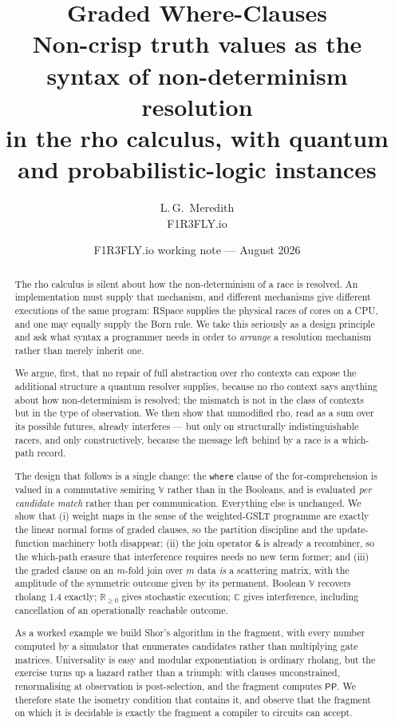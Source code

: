 \documentclass[11pt,a4paper]{article}
\title{\bfseries Graded Where-Clauses\\[4pt]
\large Non-crisp truth values as the syntax of non-determinism resolution\\
in the rho calculus, with quantum and probabilistic-logic instances}
\author{L.\,G.\ Meredith\\ \small F1R3FLY.io}
\date{F1R3FLY.io working note --- August 2026}
\theoremstyle{plain}
\theoremstyle{definition}
\theoremstyle{remark}
\newcommand{\V}{\mathbb{V}}
\newcommand{\Rnn}{\mathbb{R}_{\geq 0}}
\newcommand{\Cx}{\mathbb{C}}
\begin{document}
\maketitle

\begin{abstract}
The rho calculus is silent about how the non-determinism of a race is resolved.
An implementation must supply that mechanism, and different mechanisms give
different executions of the same program: RSpace supplies the physical races of
cores on a CPU, and one may equally supply the Born rule. We take this seriously
as a design principle and ask what syntax a programmer needs in order to
\emph{arrange} a resolution mechanism rather than merely inherit one.

We argue, first, that no repair of full abstraction over rho contexts can expose
the additional structure a quantum resolver supplies, because no rho context says
anything about how non-determinism is resolved; the mismatch is not in the class
of contexts but in the type of observation. We then show that unmodified rho,
read as a sum over its possible futures, already interferes --- but only on
structurally indistinguishable racers, and only constructively, because the
message left behind by a race is a which-path record.

The design that follows is a single change: the \texttt{where} clause of the
for-comprehension is valued in a commutative semiring $\V$ rather than in the
Booleans, and is evaluated \emph{per candidate match} rather than per
communication. Everything else is unchanged. We show that (i) weight maps in the
sense of the weighted-GSLT programme are exactly the linear normal forms of
graded clauses, so the partition discipline and the update-function machinery
both disappear; (ii) the join operator \texttt{\&} is already a recombiner, so
the which-path erasure that interference requires needs no new term former; and
(iii) the graded clause on an $m$-fold join over $m$ data \emph{is} a scattering
matrix, with the amplitude of the symmetric outcome given by its permanent.
Boolean $\V$ recovers rholang 1.4 exactly; $\Rnn$ gives stochastic execution;
$\Cx$ gives interference, including cancellation of an operationally reachable
outcome.

As a worked example we build Shor's algorithm in the fragment, with every number
computed by a simulator that enumerates candidates rather than multiplying gate
matrices. Universality is easy and modular exponentiation is ordinary rholang,
but the exercise turns up a hazard rather than a triumph: with clauses
unconstrained, renormalising at observation is post-selection, and the fragment
computes $\mathsf{PP}$. We therefore state the isometry condition that contains
it, and observe that the fragment on which it is decidable is exactly the
fragment a compiler to circuits can accept.


\end{abstract}
\end{document}
